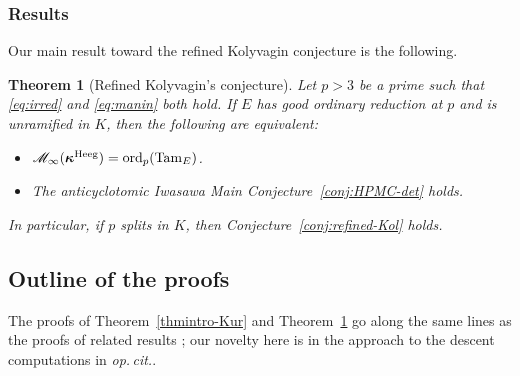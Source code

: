 \documentclass[10pt,reqno]{amsart}
\numberwithin{equation}{section}
\theoremstyle{plain}
\theoremstyle{definition}
\theoremstyle{definition}
\theoremstyle{plain}
\theoremstyle{plain}
\theoremstyle{plain}
\theoremstyle{plain}
\theoremstyle{plain}
\newtheorem{thmintro}{Theorem}
\theoremstyle{plain}
\newtheorem{corintro}{Corollary}
\begin{document}
\subsubsection{Results} Our main result toward the refined Kolyvagin conjecture is the following.


\begin{thmintro}[Refined Kolyvagin's conjecture]
\label{thmintro-Kol}
Let $p>3$ be a prime such that \eqref{eq:irred} and \eqref{eq:manin} both hold. If $E$ has good ordinary reduction at $p$ and is unramified in $K$, then the following are equivalent:
\begin{itemize}
\item[(i)] $\mathscr{M}_{\infty}(\boldsymbol{\kappa}^{\rm Heeg})={\rm ord}_p({\rm Tam}_E)$. 
\item[(ii)] The anticyclotomic Iwasawa Main Conjecture~\ref{conj:HPMC-det} holds.
\end{itemize}
In particular, if $p$ splits in $K$, then Conjecture~\ref{conj:refined-Kol} holds.
\end{thmintro}




\subsection{Outline of the proofs}\label{subsec:outline}

The proofs of Theorem~\ref{thmintro-Kur} and Theorem~\ref{thmintro-Kol} go along the same lines as the proofs of related results \cite{BCGS}; our novelty here is in the approach to the descent computations in \emph{op.\,cit.}. 
\end{document}
